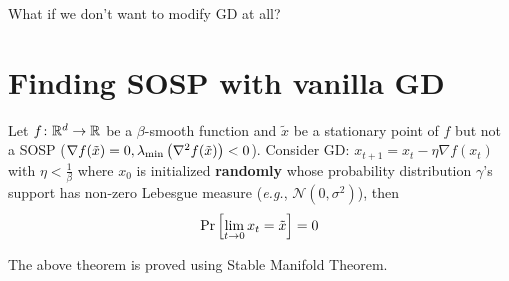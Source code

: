
What if we don't want to modify GD at all? 

\section{Finding SOSP with vanilla GD}

\begin{theorem}
    Let \(f \colon \mathbb{R}^d \to \mathbb{R}\) be a \(\beta\)-smooth function and \(\tilde{x}\) be 
    a stationary point of \(f\) but not a SOSP (\(\nabla f(\tilde{x}) = 0, 
    \lambda_{\text{min}} \left(\nabla^2 f(\tilde{x})\right) < 0\)). Consider GD: 
    \(x_{t+1} = x_t - \eta \nabla f(x_t)\) with \(\eta < \frac{1}{\beta}\) where \(x_0\) is initialized \textbf{randomly}
    whose probability distribution \(\gamma\)'s support has non-zero Lebesgue measure 
    (\emph{e.g.}, \(\mathcal{N}(0, \sigma^2)\)), then 
    \[
        \Pr \left[ \lim_{t \to 0} x_t = \tilde{x}  \right]  = 0
    \]

\end{theorem}

The above theorem is proved using Stable Manifold Theorem. 

